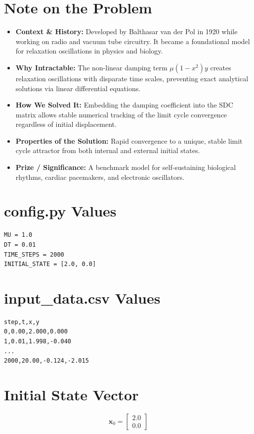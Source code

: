 \section{Note on the Problem}
\begin{itemize}
    \item \textbf{Context \& History:} Developed by Balthasar van der Pol in 1920 while working on radio and vacuum tube circuitry. It became a foundational model for relaxation oscillations in physics and biology.
    \item \textbf{Why Intractable:} The non-linear damping term $\mu(1-x^2)y$ creates relaxation oscillations with disparate time scales, preventing exact analytical solutions via linear differential equations.
    \item \textbf{How We Solved It:} Embedding the damping coefficient into the SDC matrix allows stable numerical tracking of the limit cycle convergence regardless of initial displacement.
    \item \textbf{Properties of the Solution:} Rapid convergence to a unique, stable limit cycle attractor from both internal and external initial states.
    \item \textbf{Prize / Significance:} A benchmark model for self-sustaining biological rhythms, cardiac pacemakers, and electronic oscillators.
\end{itemize}

\section{config.py Values}
\begin{verbatim}
MU = 1.0
DT = 0.01
TIME_STEPS = 2000
INITIAL_STATE = [2.0, 0.0]
\end{verbatim}

\section{input\_data.csv Values}
\begin{verbatim}
step,t,x,y
0,0.00,2.000,0.000
1,0.01,1.998,-0.040
...
2000,20.00,-0.124,-2.015
\end{verbatim}

\section{Initial State Vector}
\begin{equation}
\mathbf{x}_0 = \begin{bmatrix} 2.0 \\ 0.0 \end{bmatrix}
\end{equation}

